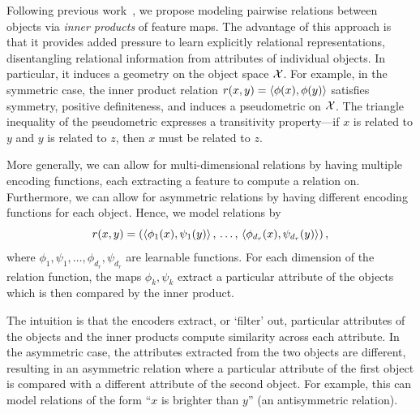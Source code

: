 Following previous work~\citep[e.g.,][]{webbEmergentSymbols2021, kergNeuralArchitecture2022, altabaaAbstractorsTransformer2023}, we propose modeling pairwise relations between objects via \textit{inner products} of feature maps.
The advantage of this approach is that it provides added pressure to learn explicitly relational representations, disentangling relational information from attributes of individual objects. In particular, it induces a geometry on the object space ${\mathcal{X}}$.
For example, in the symmetric case, the inner product relation $r(x,y) = \left \langle \phi(x), \phi(y) \right\rangle$ satisfies symmetry, positive definiteness, and induces a pseudometric on ${\mathcal{X}}$. The triangle inequality of the pseudometric expresses a transitivity property---if $x$ is related to $y$ and $y$ is related to $z$, then $x$ must be related to $z$.

More generally, we can allow for multi-dimensional relations by having multiple encoding functions, each extracting a feature to compute a relation on. Furthermore, we can allow for asymmetric relations by having different encoding functions for each object. Hence, we model relations by
\begin{equation}\label{eq:relation_function}
    r(x, y) = \left(
        \left \langle \phi_1(x), \psi_1(y) \right\rangle,\, \ldots,\, \left \langle \phi_{d_r}(x), \psi_{d_r}(y) \right\rangle\right),
\end{equation}
where $\phi_1, \psi_1, \ldots, \phi_{d_r}, \psi_{d_r}$ are learnable functions. For each dimension of the relation function, the maps $\phi_k, \psi_k$ extract a particular attribute of the objects which is then compared by the inner product.

The intuition is that the encoders extract, or `filter' out, particular attributes of the objects and the inner products compute similarity across each attribute.
In the asymmetric case, the attributes extracted from the two objects are different, resulting in an asymmetric relation where a particular attribute of the first object is compared with a different attribute of the second object. For example, this can model relations of the form ``$x$ is brighter than $y$'' (an antisymmetric relation).

